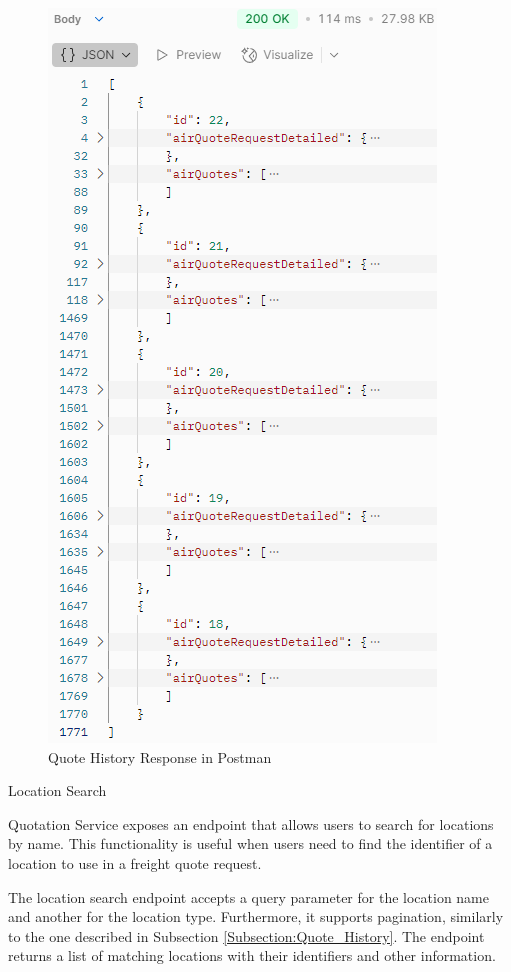 \documentclass[12pt, reqno, oneside]{amsbook}
\makeatletter
\def\subsection{\@startsection{subsection}{2}%
      \z@{.5\linespacing\@plus.7\linespacing}{.25\linespacing}%
      {\normalfont\bfseries\flushleft}}
\theoremstyle{definition}
\theoremstyle{definition}
\numberwithin{section}{chapter}
\numberwithin{table}{chapter}
\numberwithin{figure}{chapter}
\makeatother
\begin{document}
\begin{figure}[H]
  \centering
  \includegraphics[width=0.7\linewidth]{images/QuoteHistoryResponsePostman.png}
  \caption{\label{Figure:QuoteHistoryResponsePostman}Quote History Response in Postman}
\end{figure}

\pagebreak

\subsection{Location Search}
\label{Subsection:Location_Search}

Quotation Service exposes an endpoint that allows users to search for locations by name. This functionality is useful when users need to find the identifier of a location to use in a freight quote request.

The location search endpoint accepts a query parameter for the location name and another for the location type. Furthermore, it supports pagination, similarly to the one described in Subsection \ref{Subsection:Quote_History}. The endpoint returns a list of matching locations with their identifiers and other information.
\end{document}
